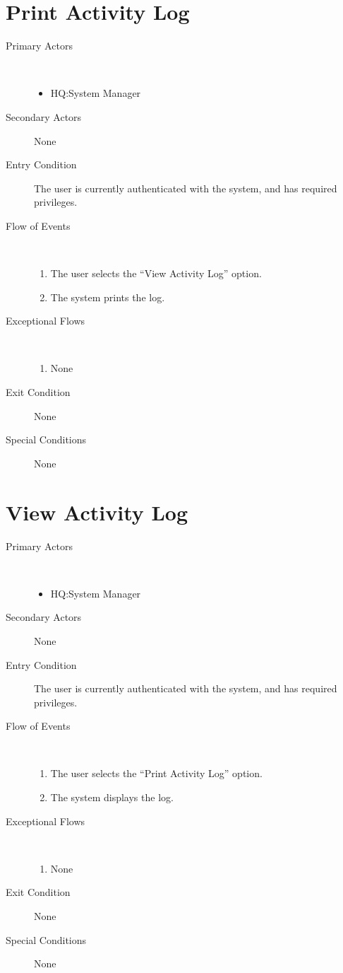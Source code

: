 \documentclass[a4paper,10pt]{report}
\begin{document}
\section{Print Activity Log}
\begin{description}
\item[Primary Actors] \
  \begin{itemize}
  \item HQ:System Manager
  \end{itemize}
\item[Secondary Actors] None
\item[Entry Condition]
  The user is currently authenticated with the system, and has required privileges.
\item[Flow of Events] \
  \begin{enumerate}
  \item The user selects the ``View Activity Log'' option.
  \item The system prints the log.
  \end{enumerate}
\item[Exceptional Flows] \
  \begin{enumerate}
  \item None
  \end{enumerate}
\item[Exit Condition]
  None
\item[Special Conditions] None
\end{description}


\section{View Activity Log}
\begin{description}
\item[Primary Actors] \
  \begin{itemize}
  \item HQ:System Manager
  \end{itemize}
\item[Secondary Actors] None
\item[Entry Condition]
  The user is currently authenticated with the system, and has required privileges.
\item[Flow of Events] \
  \begin{enumerate}
  \item The user selects the ``Print Activity Log'' option.
  \item The system displays the log.
  \end{enumerate}
\item[Exceptional Flows] \
  \begin{enumerate}
  \item None
  \end{enumerate}
\item[Exit Condition]
  None
\item[Special Conditions] None
\end{description}
\end{document}
